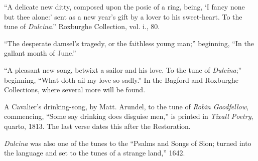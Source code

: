 “A delicate new ditty, composed upon the posie of a ring, being, ‘I fancy none
but thee alone:’ sent as a new year’s gift by a lover to his sweet-heart. To the
tune of \textit{Dulcina}.” Roxburghe Collection, vol. i., 80.

“The desperate damsel’s tragedy, or the faithless young man;” beginning,
“In the gallant month of June.”

“A pleasant new song, betwixt a sailor and his love. To the tune of \textit{Dulcina};”
beginning, “What doth ail my love so sadly.” In the Bagford and Roxburghe
Collections, where several more will be found.

A Cavalier’s drinking-song, by Matt. Arundel, to the tune of \textit{Robin Goodfellow},
commencing, “Some say drinking does disguise men,” is printed in \textit{Tixall
Poetry}, quarto, 1813. The last verse dates this after the Restoration.

\textit{Dulcina} was also one of the tunes to the “Psalms and Songs of Sion; turned
into the language and set to the tunes of a strange land,” 1642.



\pagebreak
